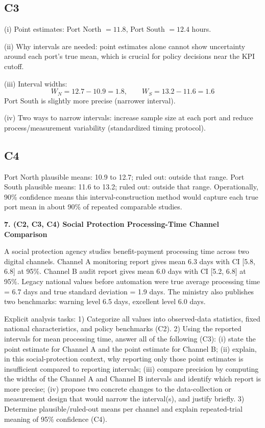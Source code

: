 \begin{ExamProblems}
		\subsection*{C3}
		(i) Point estimates: Port North $=11.8$, Port South $=12.4$ hours.
		
		(ii) Why intervals are needed: point estimates alone cannot show uncertainty around each port's true mean, which is crucial for policy decisions near the KPI cutoff.
		
		(iii) Interval widths:
		\[
		W_N=12.7-10.9=1.8,\qquad W_S=13.2-11.6=1.6
		\]
		Port South is slightly more precise (narrower interval).
		
		(iv) Two ways to narrow intervals: increase sample size at each port and reduce process/measurement variability (standardized timing protocol).
		
		\subsection*{C4}
		Port North plausible means: 10.9 to 12.7; ruled out: outside that range.
		Port South plausible means: 11.6 to 13.2; ruled out: outside that range.
		Operationally, 90\% confidence means this interval-construction method would capture each true port mean in about 90\% of repeated comparable studies.
		
		\newpage
		\item
		\textbf{7. (C2, C3, C4) Social Protection Processing-Time Channel Comparison}
		
		A social protection agency studies benefit-payment processing time across two digital channels.
		Channel A monitoring report gives mean 6.3 days with CI [5.8, 6.8] at 95\%.
		Channel B audit report gives mean 6.0 days with CI [5.2, 6.8] at 95\%.
		Legacy national values before automation were true average processing time = 6.7 days and true standard deviation = 1.9 days.
		The ministry also publishes two benchmarks: warning level 6.5 days, excellent level 6.0 days.
		
		Explicit analysis tasks:
		1) Categorize all values into observed-data statistics, fixed national characteristics, and policy benchmarks (C2).
		2) Using the reported intervals for mean processing time, answer all of the following (C3): (i) state the point estimate for Channel A and the point estimate for Channel B; (ii) explain, in this social-protection context, why reporting only those point estimates is insufficient compared to reporting intervals; (iii) compare precision by computing the widths of the Channel A and Channel B intervals and identify which report is more precise; (iv) propose two concrete changes to the data-collection or measurement design that would narrow the interval(s), and justify briefly.
		3) Determine plausible/ruled-out means per channel and explain repeated-trial meaning of 95\% confidence (C4).
		

\end{ExamProblems}
